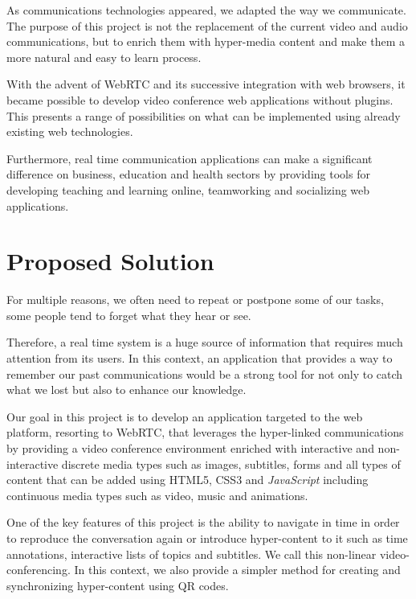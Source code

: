 	As communications technologies appeared, we adapted the way we communicate. The purpose of this project is not the replacement of the current video and audio communications, but to enrich them with hyper-media content and make them a more natural and easy to learn process. 

	With the advent of WebRTC and its successive integration with web browsers, it became possible to develop video conference web applications without plugins. This presents a range of possibilities on what can be implemented using already existing web technologies.
		
    Furthermore, real time communication applications can make a significant difference on business, education and health sectors by providing tools for developing teaching and learning online, teamworking and socializing web applications.



\section{Proposed Solution}
\label{section:proposed}

	For multiple reasons, we often need to repeat or postpone some of our tasks, some people tend to forget what they hear or see.     
        
	Therefore, a real time system is a huge source of information that requires much attention from its users. In this context, an application that provides a way to remember our past communications would be a strong tool for not only to catch what we lost but also to enhance our knowledge.

	Our goal in this project is to develop an application targeted to the web platform, resorting to \ac{WebRTC}, that leverages the hyper-linked communications by providing a video conference environment enriched with interactive and non-interactive discrete media types such as images, subtitles, forms and all types of content that can be added using \ac{HTML}5, \ac{CSS}3 and \emph{JavaScript} including continuous media types such as video, music and animations.

	One of the key features of this project is the ability to navigate in time in order to reproduce the conversation again or introduce hyper-content to it such as time annotations, interactive lists of topics and subtitles. We call this non-linear video-conferencing. In this context, we also provide a simpler method for creating and synchronizing hyper-content using \ac{QR} codes.


